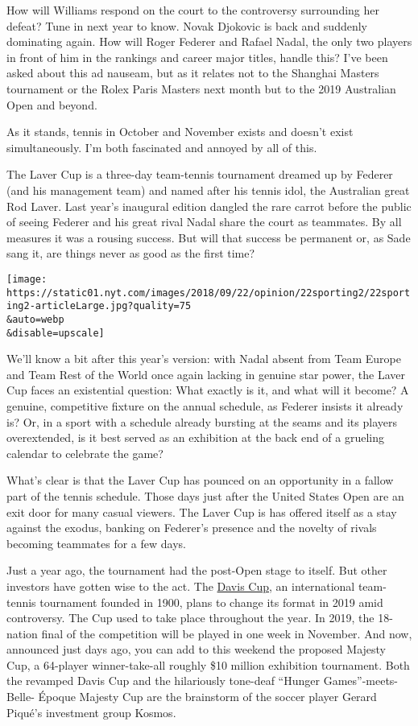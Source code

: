 How will Williams respond on the court to the controversy surrounding
her defeat? Tune in next year to know. Novak Djokovic is back and
suddenly dominating again. How will Roger Federer and Rafael Nadal, the
only two players in front of him in the rankings and career major
titles, handle this? I've been asked about this ad nauseam, but as it
relates not to the Shanghai Masters tournament or the Rolex Paris
Masters next month but to the 2019 Australian Open and beyond.

As it stands, tennis in October and November exists and doesn't exist
simultaneously. I'm both fascinated and annoyed by all of this.

The Laver Cup is a three-day team-tennis tournament dreamed up by
Federer (and his management team) and named after his tennis idol, the
Australian great Rod Laver. Last year's inaugural edition dangled the
rare carrot before the public of seeing Federer and his great rival
Nadal share the court as teammates. By all measures it was a rousing
success. But will that success be permanent or, as Sade sang it, are
things never as good as the first time?

\texttt{[image: https://static01.nyt.com/images/2018/09/22/opinion/22sporting2/22sporting2-articleLarge.jpg?quality=75\\\&auto=webp\\\&disable=upscale]}

We'll know a bit after this year's version: with Nadal absent from Team
Europe and Team Rest of the World once again lacking in genuine star
power, the Laver Cup faces an existential question: What exactly is it,
and what will it become? A genuine, competitive fixture on the annual
schedule, as Federer insists it already is? Or, in a sport with a
schedule already bursting at the seams and its players overextended, is
it best served as an exhibition at the back end of a grueling calendar
to celebrate the game?

What's clear is that the Laver Cup has pounced on an opportunity in a
fallow part of the tennis schedule. Those days just after the United
States Open are an exit door for many casual viewers. The Laver Cup is
has offered itself as a stay against the exodus, banking on Federer's
presence and the novelty of rivals becoming teammates for a few days.

Just a year ago, the tournament had the post-Open stage to itself. But
other investors have gotten wise to the act. The
\href{https://www.daviscup.com/en/organisation/davis-cup-history.aspx}{Davis
Cup}, an international team-tennis tournament founded in 1900, plans to
change its format in 2019 amid controversy. The Cup used to take place
throughout the year. In 2019, the 18-nation final of the competition
will be played in one week in November. And now, announced just days
ago, you can add to this weekend the proposed Majesty Cup, a 64-player
winner-take-all roughly \$10 million exhibition tournament. Both the
revamped Davis Cup and the hilariously tone-deaf ``Hunger
Games''-meets-Belle- Époque Majesty Cup are the brainstorm of the soccer
player Gerard Piqué's investment group Kosmos.

